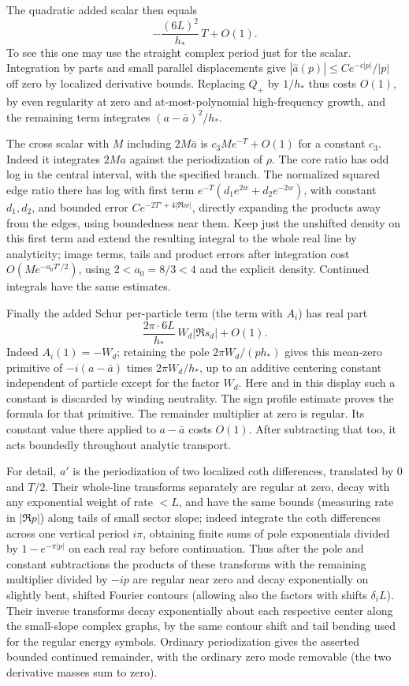 The quadratic added scalar then equals
\[
 -\frac{(6L)^2}{h_*}\,T+O(1).
\]
To see this one may use the straight complex period just for the scalar. Integration by parts and small parallel displacements give \(|\widehat a(p)|\le C e^{-c|p|}/|p|\) off zero by localized derivative bounds. Replacing \(Q_+\) by \(1/h_*\) thus costs \(O(1)\), by even regularity at zero and at-most-polynomial high-frequency growth, and the remaining term integrates \((a-\bar a)^2/h_*\).

The cross scalar with \(M\) including \(2M\bar a\) is \(c_3 M e^{-T}+O(1)\) for a constant \(c_3\). Indeed it integrates \(2M a\) against the periodization of \(\rho\). The core ratio has odd log in the central interval, with the specified branch. The normalized squared edge ratio there has log with first term \(e^{-T}(d_1 e^{2w}+d_2 e^{-2w})\), with constant \(d_1,d_2\), and bounded error \(C e^{-2T'+4|\Re w|}\), directly expanding the products away from the edges, using boundedness near them. Keep just the unshifted density on this first term and extend the resulting integral to the whole real line by analyticity; image terms, tails and product errors after integration cost \(O(M e^{-a_0 T'/2})\), using \(2<a_0=8/3<4\) and the explicit density. Continued integrals have the same estimates.

Finally the added Schur per-particle term (the term with \(A_i\)) has real part
\[
 \frac{2\pi\cdot6L}{h_*}\,W_d |\Re s_d|+O(1).
\]
Indeed \(A_i(1)=-W_d\); retaining the pole \(2\pi W_d/(p h_*)\) gives this mean-zero primitive of \(-i(a-\bar a)\) times \(2\pi W_d/h_*\), up to an additive centering constant independent of particle except for the factor \(W_d\). Here and in this display such a constant is discarded by winding neutrality. The sign profile estimate proves the formula for that primitive. The remainder multiplier at zero is regular. Its constant value there applied to \(a-\bar a\) costs \(O(1)\). After subtracting that too, it acts boundedly throughout analytic transport.

For detail, \(a'\) is the periodization of two localized coth differences, translated by 0 and \(T/2\). Their whole-line transforms separately are regular at zero, decay with any exponential weight of rate \(<L\), and have the same bounds (measuring rate in \(|\Re p|\)) along tails of small sector slope; indeed integrate the coth differences across one vertical period \(i\pi\), obtaining finite sums of pole exponentials divided by \(1-e^{-\pi |p|}\) on each real ray before continuation. Thus after the pole and constant subtractions the products of these transforms with the remaining multiplier divided by \(-ip\) are regular near zero and decay exponentially on slightly bent, shifted Fourier contours (allowing also the factors with shifts \(\delta_i L\)). Their inverse transforms decay exponentially about each respective center along the small-slope complex graphs, by the same contour shift and tail bending used for the regular energy symbols. Ordinary periodization gives the asserted bounded continued remainder, with the ordinary zero mode removable (the two derivative masses sum to zero).

